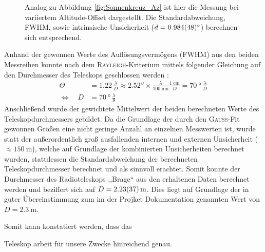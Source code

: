     \begin{figure}[H]
        \centering
        
        \caption[Kreuz-Scan der Sonne, Altitude Offset]{Analog zu Abbildung \ref{fig:Sonnenkreuz_Az} ist hier die Messung bei variiertem Altitude-Offset dargestellt. Die Standardabweichung, FWHM, sowie intrinsische Unsicherheit ($d = \SI{0.984 \pm 0.048}{\degree}$) berechnen sich entsprechend.}
        \label{fig:Sonnenkreuz_Alt}
    \end{figure}

    Anhand der gewonnen Werte des Auflösungsvermögens (FWHM) aus den beiden Messreihen konnte nach dem \textsc{Rayleigh}-Kriterium mittels folgender Gleichung auf den Durchmesser des Teleskops geschlossen werden \cite{Karttunen2013}:
    \begin{align}
        \Theta &= 1.22 \, \frac{\lambda}{D} \approx \ang{;;2.52} \times \frac{\lambda}{\SI{100}{\nano \metre}} \frac{\SI{1}{\centi \metre}}{D} = \SI{70}{\degree} \, \frac{\lambda}{D}\\
        \Leftrightarrow \quad D &= \SI{70}{\degree} \, \frac{\lambda}{\theta}
    \end{align}
    Anschließend wurde der gewichtete Mittelwert der beiden berechneten Werte des Teleskopdurchmessers gebildet. Da die Grundlage der durch den \textsc{Gauß}-Fit gewonnen Größen eine nicht geringe Anzahl an einzelnen Messwerten ist, wurde statt der außerordentlich groß ausfallenden internen und externen Unsicherheit ($\approx \SI{150}{\metre}$), welche auf Grundlage der kombinierten Unsicherheiten berechnet wurden, stattdessen die Standardabweichung der berechneten Teleskopdurchmesser berechnet und als sinnvoll erachtet. Somit konnte der Durchmesser des Radioteleskops ,,Brage`` aus den erhaltenen Daten berechnet werden und beziffert sich auf $D = \SI{2.23 \pm 0.37}{\metre}$. Dies liegt auf Grundlage der in guter Übereinstimmung zum im der Projket Dokumentation \cite{Usermanual} genannten Wert von $D = \SI{2.3}{\metre}$. 
    
    
    Somit kann konstatiert werden, dass das 

    Teleskop arbeit für unsere Zwecke hinreichend genau.